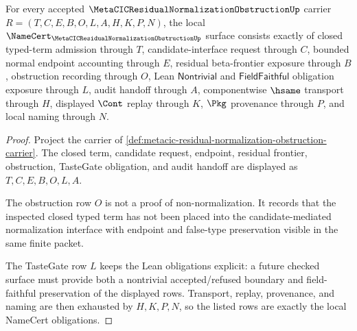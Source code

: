 \begin{theorem}
\label{thm:metacic-residual-normalization-obstruction-namecert-obligations}
For every accepted $\MetaCICResidualNormalizationObstructionUp$ carrier $R=(T,C,E,B,O,L,A,H,K,P,N)$, the local $\NameCert_{\MetaCICResidualNormalizationObstructionUp}$ surface consists exactly of closed typed-term admission through $T$, candidate-interface request through $C$, bounded normal endpoint accounting through $E$, residual beta-frontier exposure through $B$, obstruction recording through $O$, Lean $\mathsf{Nontrivial}$ and $\mathsf{FieldFaithful}$ obligation exposure through $L$, audit handoff through $A$, componentwise $\hsame$ transport through $H$, displayed $\Cont$ replay through $K$, $\Pkg$ provenance through $P$, and local naming through $N$.
\end{theorem}
\begin{proof}
Project the carrier of \autoref{def:metacic-residual-normalization-obstruction-carrier}. The closed term, candidate request, endpoint, residual frontier, obstruction, TasteGate obligation, and audit handoff are displayed as $T,C,E,B,O,L,A$.

The obstruction row $O$ is not a proof of non-normalization. It records that the inspected closed typed term has not been placed into the candidate-mediated normalization interface with endpoint and false-type preservation visible in the same finite packet.

The TasteGate row $L$ keeps the Lean obligations explicit: a future checked surface must provide both a nontrivial accepted/refused boundary and field-faithful preservation of the displayed rows. Transport, replay, provenance, and naming are then exhausted by $H,K,P,N$, so the listed rows are exactly the local NameCert obligations.
\end{proof}

